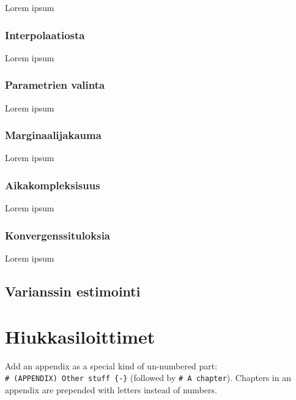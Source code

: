 \documentclass[
  12pt,
  a4paper, twoside]{book}
\theoremstyle{definition}
\theoremstyle{definition}
\theoremstyle{definition}
\theoremstyle{definition}
\theoremstyle{remark}
\begin{document}
Lorem ipsum

\hypertarget{interpolaatiosta}{%
\subsection{Interpolaatiosta}\label{interpolaatiosta}}

Lorem ipsum

\hypertarget{parametrien-valinta}{%
\subsection{Parametrien valinta}\label{parametrien-valinta}}

Lorem ipsum

\hypertarget{marginaalijakauma}{%
\subsection{Marginaalijakauma}\label{marginaalijakauma}}

Lorem ipsum

\hypertarget{aikakompleksisuus}{%
\subsection{Aikakompleksisuus}\label{aikakompleksisuus}}

Lorem ipsum

\hypertarget{konvergenssituloksia}{%
\subsection{Konvergenssituloksia}\label{konvergenssituloksia}}

Lorem ipsum

\hypertarget{varianssin-estimointi}{%
\section{Varianssin estimointi}\label{varianssin-estimointi}}

\hypertarget{hiukkasiloittimet}{%
\chapter{Hiukkasiloittimet}\label{hiukkasiloittimet}}

Add an appendix as a special kind of un-numbered part: \texttt{\#\ (APPENDIX)\ Other\ stuff\ \{-\}} (followed by \texttt{\#\ A\ chapter}). Chapters in an appendix are prepended with letters instead of numbers.
\end{document}
